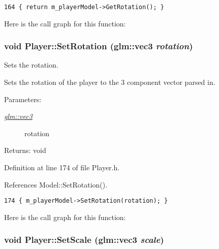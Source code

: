 \begin{Code}\begin{verbatim}164 { return m_playerModel->GetRotation(); }
\end{verbatim}
\end{Code}




Here is the call graph for this function:\hypertarget{class_player_2e3d2df5baf6a9b83e06bcae3aaeccd6}{
\subsubsection[SetRotation]{\setlength{\rightskip}{0pt plus 5cm}void Player::SetRotation ({\bf glm::vec3} {\em rotation})}}
\label{class_player_2e3d2df5baf6a9b83e06bcae3aaeccd6}


Sets the rotation. 

Sets the rotation of the player to the 3 component vector parsed in.

\begin{Desc}
\item[Parameters:]
\begin{description}
\item[{\em \hyperlink{group__core__types_g1c47e8b3386109bc992b6c48e91b0be7}{glm::vec3}}]rotation \end{description}
\end{Desc}
\begin{Desc}
\item[Returns:]void \end{Desc}


Definition at line 174 of file Player.h.

References Model::SetRotation().

\begin{Code}\begin{verbatim}174 { m_playerModel->SetRotation(rotation); }
\end{verbatim}
\end{Code}




Here is the call graph for this function:\hypertarget{class_player_454ad879bdf9073c89b1055647e6f8c6}{
\subsubsection[SetScale]{\setlength{\rightskip}{0pt plus 5cm}void Player::SetScale ({\bf glm::vec3} {\em scale})}}
\label{class_player_454ad879bdf9073c89b1055647e6f8c6}


